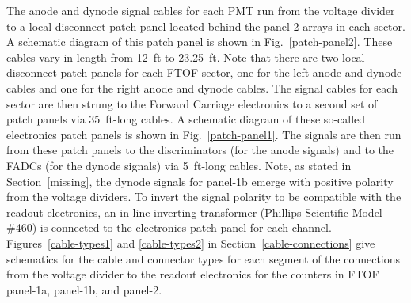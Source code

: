 \documentclass[12pt]{article}
\begin{document}
The anode and dynode signal cables for each PMT run from the voltage divider to a local 
disconnect patch panel located behind the panel-2 arrays in each sector. A schematic 
diagram of this patch panel is shown in Fig.~\ref{patch-panel2}. These cables vary in 
length from 12~ft to 23.25~ft. Note that there are two local disconnect patch panels for 
each FTOF sector, one for the left anode and dynode cables and one for the right anode 
and dynode cables. The signal cables for each sector are then strung to the Forward 
Carriage electronics to a second set of patch panels via 35~ft-long cables. A schematic 
diagram of these so-called electronics patch panels is shown in Fig.~\ref{patch-panel1}. 
The signals are then run from these patch panels to the discriminators (for the anode 
signals) and to the FADCs (for the dynode signals) via 5~ft-long cables. Note, as stated 
in Section~\ref{missing}, the dynode signals for panel-1b emerge with positive 
polarity from the voltage dividers. To invert the signal polarity to be compatible with 
the readout electronics, an in-line inverting transformer (Phillips Scientific Model 
\#460) is connected to the electronics patch panel for each channel. 
Figures~\ref{cable-types1} and \ref{cable-types2} in Section~\ref{cable-connections} give 
schematics for the cable and connector types for each segment of the connections from 
the voltage divider to the readout electronics for the counters in FTOF panel-1a, 
panel-1b, and panel-2.
\end{document}
